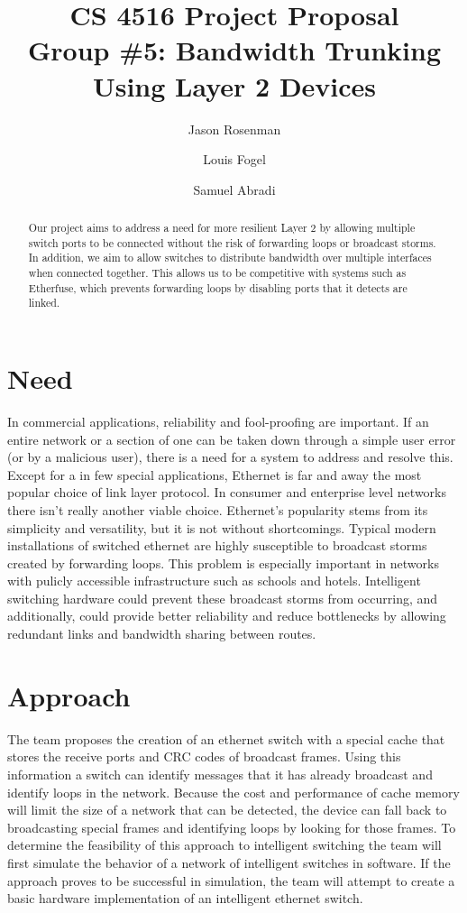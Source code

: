 \documentclass{article}
\title{CS 4516 Project Proposal\\Group \#5: Bandwidth Trunking Using Layer 2 Devices}
\author{Jason Rosenman \and Louis Fogel \and Samuel Abradi}
\date{}
\begin{document}
\maketitle
\begin{abstract}
	Our project aims to address a need for more resilient Layer 2 by allowing multiple switch ports to be connected without the risk of forwarding loops or broadcast storms.
	In addition, we aim to allow switches to distribute bandwidth over multiple interfaces when connected together.
	This allows us to be competitive with systems such as Etherfuse, which prevents forwarding loops by disabling ports that it detects are linked.
\end{abstract}
\section{Need}
	In commercial applications, reliability and fool-proofing are important.
	If an entire network or a section of one can be taken down through a simple user error (or by a malicious user), there is a need for a system to address and resolve this.
	Except for a in few special applications, Ethernet is far and away the most popular choice of link layer protocol. In consumer and enterprise level networks there isn’t really another viable choice. Ethernet’s popularity stems from its simplicity and versatility, but it is not without shortcomings. Typical modern installations of switched ethernet are highly susceptible to broadcast storms created by forwarding loops. This problem is especially important in networks with pulicly accessible infrastructure such as schools and hotels. Intelligent switching hardware could prevent these broadcast storms from occurring, and additionally, could provide better reliability and reduce bottlenecks by allowing redundant links and bandwidth sharing between routes.
\section{Approach}
    The team proposes the creation of an ethernet switch with a special cache that stores the receive ports and CRC codes of broadcast frames. Using this information a switch can identify messages that it has already broadcast and identify loops in the network. Because the cost and performance of cache memory will limit the size of a network that can be detected, the device can fall back to broadcasting special frames and identifying loops by looking for those frames.
    To determine the feasibility of this approach to intelligent switching the team will first simulate the behavior of a network of intelligent switches in software. If the approach proves to be successful in simulation, the team will attempt to create a basic hardware implementation of an intelligent ethernet switch. 
\end{document}

